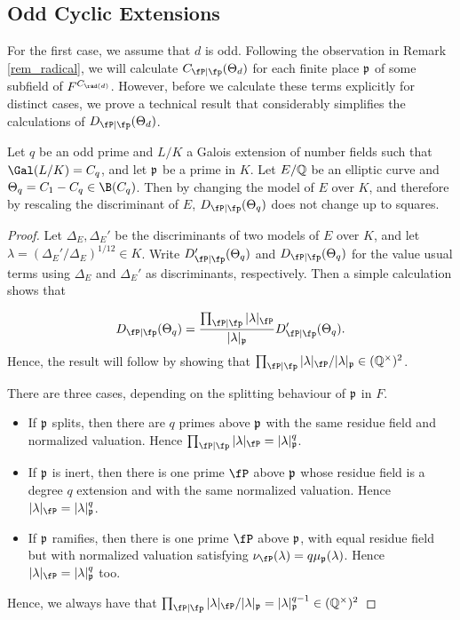 \subsection{Odd Cyclic Extensions} \label{sec_oddcyclic}

For the first case, we assume that $d$ is odd. Following the observation in Remark \ref{rem_radical}, we will calculate $\Cp(\Theta_d)$ for each finite place $\mathfrak{p}$ of some subfield of $F^{C_{\rad(d)}}$. However, before we calculate these terms explicitly for distinct cases, we prove a technical result that considerably simplifies the calculations of $\Dp(\Theta_d)$.

\begin{lemma}
    Let $q$ be an odd prime and $L/K$ a Galois extension of number fields such that $\Gal(L/K)=C_q$, and let $\mathfrak{p}$ be a prime in $K$. Let $E/\mathbb{Q}$ be an elliptic curve and $\Theta_q=C_1-C_q\in \B(C_q)$. Then by changing the model of $E$ over $K$, and therefore by rescaling the discriminant of $E$, $\Dp(\Theta_q)$ does not change up to squares.
\end{lemma}
\begin{proof}
    Let $\Delta_E,\Delta_E'$ be the discriminants of two models of $E$ over $K$, and let $\lambda=(\Delta_E'/\Delta_E)^{1/12}\in K$. Write $\Dp'(\Theta_q)$ and $\Dp(\Theta_q)$ for the value usual terms using $\Delta_E$ and $\Delta_E'$ as discriminants, respectively. Then a simple calculation shows that
    
    $$\Dp(\Theta_q)=\frac{\prod_{\fP\mid\fp}|\lambda|_\fP}{|\lambda|_\pp}\Dp'(\Theta_q).$$
    Hence, the result will follow by showing that $\prod_{\fP\mid\fp}|\lambda|_\fP/|\lambda|_\pp\in\QQss$. 
    
    There are three cases, depending on the splitting behaviour of $\mathfrak{p}$ in $F$. 
    \begin{itemize}
        \item If $\mathfrak{p}$ splits, then there are $q$ primes above $\mathfrak{p}$ with the same residue field and normalized valuation. Hence $\prod_{\fP\mid\fp}|\lambda|_\fP=|\lambda|_\pp^q$.
        \item If $\mathfrak{p}$ is inert, then there is one prime $\fP$ above $\mathfrak{p}$ whose residue field is a degree $q$ extension and with the same normalized valuation. Hence $|\lambda|_\fP=|\lambda|_\pp^q$.
        \item If $\mathfrak{p}$ ramifies, then there is one prime $\fP$ above $\mathfrak{p}$, with equal residue field but with normalized valuation satisfying $\nu_\fP(\lambda)=q\mu_\pp(\lambda)$. Hence $|\lambda|_\fP=|\lambda|_\pp^q$ too.
    \end{itemize}
    Hence, we always have that 
    $\prod_{\fP\mid\fp}|\lambda|_\fP / |\lambda|_\pp =|\lambda|_\pp^{q-1}\in\QQss$
\end{proof}

